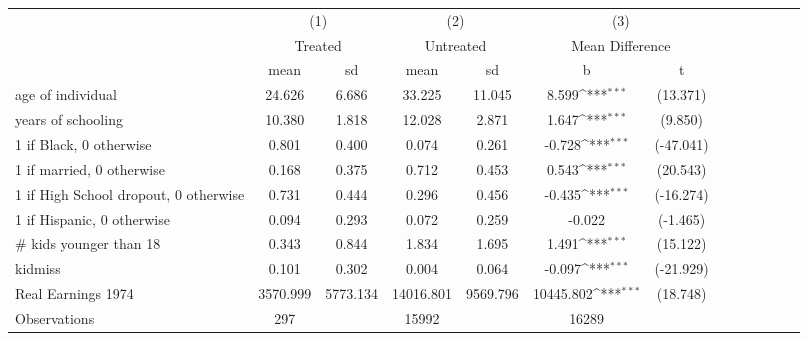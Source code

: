{
\def\sym#1{\ifmmode^{#1}\else\(^{#1}\)\fi}
\begin{tabular}{l*{3}{cccc}}
\hline\hline
                    &\multicolumn{2}{c}{(1)}  &\multicolumn{2}{c}{(2)}  &\multicolumn{2}{c}{(3)}           \\
                    &\multicolumn{2}{c}{Treated}&\multicolumn{2}{c}{Untreated}&\multicolumn{2}{c}{Mean Difference}\\
                    &        mean&          sd&        mean&          sd&           b         &           t\\
\hline
age of individual   &      24.626&       6.686&      33.225&      11.045&       8.599\sym{***}&    (13.371)\\
years of schooling  &      10.380&       1.818&      12.028&       2.871&       1.647\sym{***}&     (9.850)\\
1 if Black, 0 otherwise&       0.801&       0.400&       0.074&       0.261&      -0.728\sym{***}&   (-47.041)\\
1 if married, 0 otherwise&       0.168&       0.375&       0.712&       0.453&       0.543\sym{***}&    (20.543)\\
1 if High School dropout, 0 otherwise&       0.731&       0.444&       0.296&       0.456&      -0.435\sym{***}&   (-16.274)\\
1 if Hispanic, 0 otherwise&       0.094&       0.293&       0.072&       0.259&      -0.022         &    (-1.465)\\
# kids younger than 18&       0.343&       0.844&       1.834&       1.695&       1.491\sym{***}&    (15.122)\\
kidmiss             &       0.101&       0.302&       0.004&       0.064&      -0.097\sym{***}&   (-21.929)\\
Real Earnings 1974  &    3570.999&    5773.134&   14016.801&    9569.796&   10445.802\sym{***}&    (18.748)\\
\hline
Observations        &         297&            &       15992&            &       16289         &            \\
\hline\hline
\end{tabular}
}

